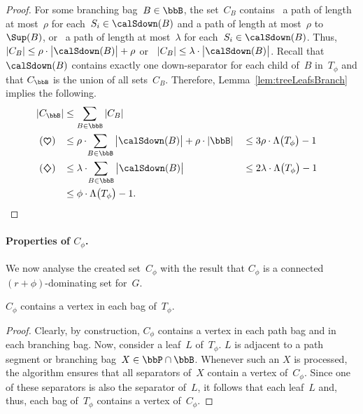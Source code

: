 \begin{proof}
For some branching bag~$B \in \bbB$, the set~$C_B$ contains \rHrt~a path of length at most~$\rho$ for each~$S_i \in \calSdown(B)$ and a path of length at most~$\rho$ to~$\Sup(B)$, or \rDmd~a path of length at most~$\lambda$ for each~$S_i \in \calSdown(B)$.
Thus, \rHrt~$|C_B| \leq \rho \cdot \big| \calSdown(B) \big| + \rho$ or \rDmd~$|C_B| \leq \lambda \cdot \big| \calSdown(B) \big|$.
Recall that $\calSdown(B)$ contains exactly one down-separator for each child of~$B$ in~$T_\phi$ and that $C_\bbB$ is the union of all sets~$C_B$.
Therefore, Lemma~\ref{lem:treeLeafsBranch} implies the following.
\begin{alignat*}{2}
    |C_\bbB|
        & \leq \sum_{B \in \bbB} |C_B| \\
    \rHrt \enspace
        &  \leq \rho \cdot \! \sum_{B \in \bbB} \big| \calSdown(B) \big| + \rho \cdot |\bbB|
        && \leq 3 \rho \cdot \Lambda \big( T_\phi \big) - 1 \\
    \rDmd \enspace
        &  \leq \lambda \cdot \! \sum_{B \in \bbB} \big| \calSdown(B) \big|
        && \leq 2 \lambda \cdot \Lambda \big( T_\phi \big) - 1 \\
        &  \leq \phi \cdot \Lambda \big( T_\phi \big) - 1.
        \qedhere
\end{alignat*}
\end{proof}

\paragraph{Properties of \( C_\phi \).}
We now analyse the created set~$C_\phi$ with the result that $C_\phi$ is a connected $(r + \phi)$-dominating set for~$G$.

\begin{lemma}
    \label{lem:CphiBagInt}
\( C_\phi \) contains a vertex in each bag of~\( T_\phi \).
\end{lemma}

\begin{proof}
Clearly, by construction, $C_\phi$ contains a vertex in each path bag and in each branching bag.
Now, consider a leaf~$L$ of~$T_\phi$.
$L$ is adjacent to a path segment or branching bag~$X \in \bbP \cap \bbB$.
Whenever such an $X$ is processed, the algorithm ensures that all separators of~$X$ contain a vertex of~$C_\phi$.
Since one of these separators is also the separator of~$L$, it follows that each leaf~$L$ and, thus, each bag of~$T_\phi$ contains a vertex of~$C_\phi$.
\end{proof}

